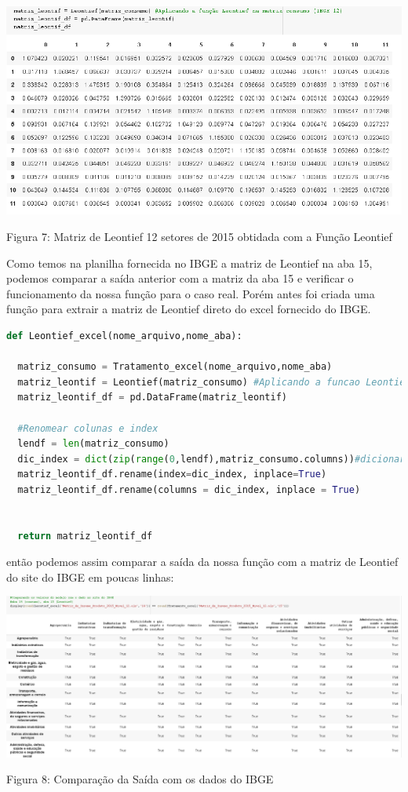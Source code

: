 \documentclass[a4paper, 12pt]{article}
\begin{document}
 \begin{center}
    \includegraphics[width=16cm]{Leontief_12_2015.PNG}
    
    Figura 7: Matriz de Leontief 12 setores de 2015 obtidada com a Função Leontief
    
\end{center}

Como temos na planilha fornecida no IBGE a matriz de Leontief na aba 15, podemos comparar a saída anterior com a matriz da aba 15 e verificar o funcionamento da nossa função para o caso real. Porém antes foi criada uma função para extrair a matriz de Leontief direto do excel fornecido do IBGE.

\begin{lstlisting}[language=Python, caption=Leontief direto do excel, label=listing_leontief_excel]
def Leontief_excel(nome_arquivo,nome_aba):

  matriz_consumo = Tratamento_excel(nome_arquivo,nome_aba)
  matriz_leontif = Leontief(matriz_consumo) #Aplicando a funcao Leontief na matriz consumo (IBGE)
  matriz_leontif_df = pd.DataFrame(matriz_leontif)

  #Renomear colunas e index  
  lendf = len(matriz_consumo)
  dic_index = dict(zip(range(0,lendf),matriz_consumo.columns))#dicionario para renomear os index e colunas
  matriz_leontif_df.rename(index=dic_index, inplace=True)
  matriz_leontif_df.rename(columns = dic_index, inplace = True)


  return matriz_leontif_df
\end{lstlisting}

então podemos assim comparar a saída da nossa função com a matriz de Leontief do site do IBGE em poucas linhas:

\begin{center}
    \includegraphics[width=16cm]{Comparacao_Leontief12.PNG}
    
    Figura 8: Comparação da Saída com os dados do IBGE
    
\end{center}
\end{document}

